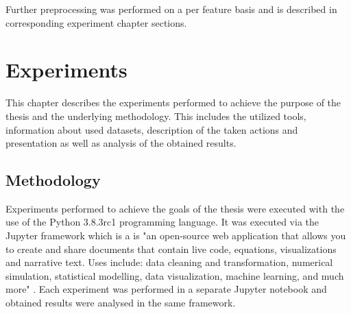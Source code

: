 \documentclass[a4paper,twoside,12pt]{book}
\begin{document}
Further preprocessing was performed on a per feature basis and is described in corresponding
experiment chapter sections.



\chapter{Experiments}

This chapter describes the experiments performed to achieve the purpose of the thesis
and the underlying methodology. This includes the utilized tools, information about used datasets,
description of the taken actions and presentation as well as analysis of the obtained results. 


\section{Methodology}

Experiments performed to achieve the goals of the thesis were executed with the use of 
the Python 3.8.3rc1 programming language. It was executed via the Jupyter framework which is
a is "an open-source web application that allows you to create and share documents that 
contain live code, equations, visualizations and narrative text. Uses include: data cleaning 
and transformation, numerical simulation, statistical modelling, data visualization, machine 
learning, and much more" \cite{bib:jupyter}. Each experiment was performed in a separate
Jupyter notebook and obtained results were analysed in the same framework. 
\end{document}

